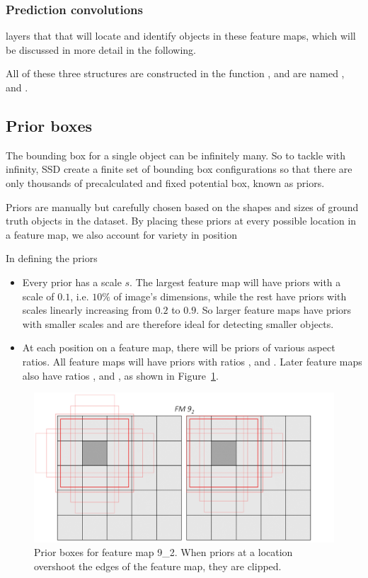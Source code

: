 \documentclass[journal,conference]{IEEEtran}
\begin{document}
\subsubsection{Prediction convolutions} layers that that will locate and identify objects in these feature maps, which will be discussed in more detail in the following.


All of these three structures are constructed in the function , and are named ,  and .

\subsection{Prior boxes}
The bounding box for a single object can be infinitely many. So to tackle with infinity, SSD create a finite set of bounding box configurations so that there are only thousands of precalculated and fixed potential box, known as priors.

Priors are manually but carefully chosen based on the shapes and sizes of ground truth objects in the dataset. By placing these priors at every possible location in a feature map, we also account for variety in position

In defining the priors
\begin{itemize}
  \item Every prior has a scale $s$. The largest feature map  will have priors with a scale of $0.1$, i.e. $10\%$ of image's dimensions, while the rest have priors with scales linearly increasing from $0.2$ to $0.9$. So larger feature maps have priors with smaller scales and are therefore ideal for detecting smaller objects.
  \item At each position on a feature map, there will be priors of various aspect ratios. All feature maps will have priors with ratios ,  and . Later feature maps also have ratios ,  and , as shown in Figure~\ref{fig:prior}.
\end{itemize}

\begin{figure}[htbp]
  \centering
  \includegraphics[width=\linewidth]{fig/priors2.jpg}
  \caption{Prior boxes for feature map 9\_2. When priors at a location overshoot the edges of the feature map, they are clipped.}\label{fig:prior}
\end{figure}
\end{document}
